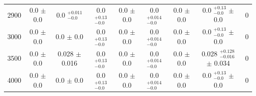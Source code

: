 \begin{table}[H]
\begin{center}
\begin{tabular}{ccccccccc}
            2900  &     0.0 $\pm$ 0.0  &      	 0.0 $ _{-0.0}^{+0.011}$   &    0.0 $ _{-0.0}^{+0.13}$   &  0.0 $\pm$ 0.0  &        0.0 $ _{-0.0}^{+0.014}$   & 0.0 $\pm$ 0.0  &        0.0 $ _{-0.0}^{+0.13}$   $\pm$ 0.0  &               0 \\
            3000  &     0.0 $\pm$ 0.0  &      	 0.0 $\pm$ 0.0  &               0.0 $ _{-0.0}^{+0.13}$   &  0.0 $\pm$ 0.0  &        0.0 $ _{-0.0}^{+0.014}$   & 0.0 $\pm$ 0.0  &        0.0 $ _{-0.0}^{+0.13}$   $\pm$ 0.0  &               0 \\
            3500  &     0.0 $\pm$ 0.0  &      	 0.028 $\pm$ 0.016  &           0.0 $ _{-0.0}^{+0.13}$   &  0.0 $\pm$ 0.0  &        0.0 $ _{-0.0}^{+0.014}$   & 0.0 $\pm$ 0.0  &        0.028 $ _{-0.016}^{+0.128}$   $\pm$ 0.034  &        0 \\
            4000  &     0.0 $\pm$ 0.0  &      	 0.0 $\pm$ 0.0  &               0.0 $ _{-0.0}^{+0.13}$   &  0.0 $\pm$ 0.0  &        0.0 $ _{-0.0}^{+0.014}$   & 0.0 $\pm$ 0.0  &        0.0 $ _{-0.0}^{+0.13}$   $\pm$ 0.0  &               0 \\
            \hline \hline
        \end{tabular}
        \label{tab:eventyields2016}
    \end{center}
\end{table}






